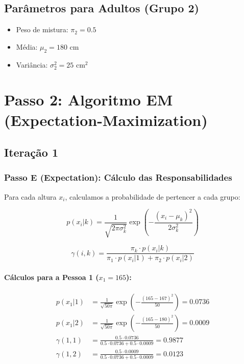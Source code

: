 \documentclass{article}
\begin{document}
\subsection{Parâmetros para Adultos (Grupo 2)}
\begin{itemize}
    \item Peso de mistura: $\pi_2 = 0.5$
    \item Média: $\mu_2 = 180$ cm
    \item Variância: $\sigma_2^2 = 25$ cm$^2$
\end{itemize}

\section{Passo 2: Algoritmo EM (Expectation-Maximization)}

\subsection{Iteração 1}

\subsubsection{Passo E (Expectation): Cálculo das Responsabilidades}
Para cada altura $x_i$, calculamos a probabilidade de pertencer a cada grupo:

\begin{equation}
p(x_i|k) = \frac{1}{\sqrt{2\pi\sigma_k^2}} \exp\left(-\frac{(x_i - \mu_k)^2}{2\sigma_k^2}\right)
\end{equation}

\begin{equation}
\gamma(i,k) = \frac{\pi_k \cdot p(x_i|k)}{\pi_1 \cdot p(x_i|1) + \pi_2 \cdot p(x_i|2)}
\end{equation}

\paragraph{Cálculos para a Pessoa 1 ($x_1 = 165$):}
\begin{align*}
p(x_1|1) &= \frac{1}{\sqrt{50\pi}} \exp\left(-\frac{(165-167)^2}{50}\right) = 0.0736 \\
p(x_1|2) &= \frac{1}{\sqrt{50\pi}} \exp\left(-\frac{(165-180)^2}{50}\right) = 0.0009 \\
\gamma(1,1) &= \frac{0.5 \cdot 0.0736}{0.5 \cdot 0.0736 + 0.5 \cdot 0.0009} = 0.9877 \\
\gamma(1,2) &= \frac{0.5 \cdot 0.0009}{0.5 \cdot 0.0736 + 0.5 \cdot 0.0009} = 0.0123
\end{align*}
\end{document}
